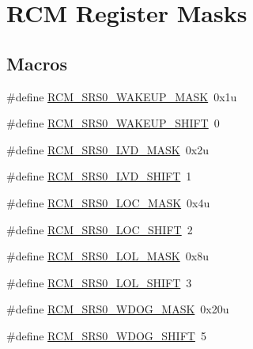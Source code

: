 \hypertarget{group___r_c_m___register___masks}{}\section{R\+CM Register Masks}
\label{group___r_c_m___register___masks}
\subsection*{Macros}
\begin{DoxyCompactItemize}
\item 
\#define \hyperlink{group___r_c_m___register___masks_gacdeb6976064d599d6cd063b26a25dbda}{R\+C\+M\+\_\+\+S\+R\+S0\+\_\+\+W\+A\+K\+E\+U\+P\+\_\+\+M\+A\+SK}~0x1u
\item 
\#define \hyperlink{group___r_c_m___register___masks_ga2e140fc50106a6145cffe4b72671bbc2}{R\+C\+M\+\_\+\+S\+R\+S0\+\_\+\+W\+A\+K\+E\+U\+P\+\_\+\+S\+H\+I\+FT}~0
\item 
\#define \hyperlink{group___r_c_m___register___masks_ga4de74187b3bcc5b40a526b3ab5afda88}{R\+C\+M\+\_\+\+S\+R\+S0\+\_\+\+L\+V\+D\+\_\+\+M\+A\+SK}~0x2u
\item 
\#define \hyperlink{group___r_c_m___register___masks_gad3f4cb02d84182ddd0933dc93e1ec4ba}{R\+C\+M\+\_\+\+S\+R\+S0\+\_\+\+L\+V\+D\+\_\+\+S\+H\+I\+FT}~1
\item 
\#define \hyperlink{group___r_c_m___register___masks_ga0983314adae781518e2481ae518e14d8}{R\+C\+M\+\_\+\+S\+R\+S0\+\_\+\+L\+O\+C\+\_\+\+M\+A\+SK}~0x4u
\item 
\#define \hyperlink{group___r_c_m___register___masks_ga87c1e113b052d6c10c450973efa74eb7}{R\+C\+M\+\_\+\+S\+R\+S0\+\_\+\+L\+O\+C\+\_\+\+S\+H\+I\+FT}~2
\item 
\#define \hyperlink{group___r_c_m___register___masks_ga0db6908ad880d9f7fd190fbb6922adda}{R\+C\+M\+\_\+\+S\+R\+S0\+\_\+\+L\+O\+L\+\_\+\+M\+A\+SK}~0x8u
\item 
\#define \hyperlink{group___r_c_m___register___masks_ga95ccd3811dd00bd56b397939db9b248d}{R\+C\+M\+\_\+\+S\+R\+S0\+\_\+\+L\+O\+L\+\_\+\+S\+H\+I\+FT}~3
\item 
\#define \hyperlink{group___r_c_m___register___masks_gad203634bcb298bf54a3d5cce5c378a7e}{R\+C\+M\+\_\+\+S\+R\+S0\+\_\+\+W\+D\+O\+G\+\_\+\+M\+A\+SK}~0x20u
\item 
\#define \hyperlink{group___r_c_m___register___masks_gac989a90d61cdfb7e612c212a3f6d06d8}{R\+C\+M\+\_\+\+S\+R\+S0\+\_\+\+W\+D\+O\+G\+\_\+\+S\+H\+I\+FT}~5
\item 

\end{DoxyCompactItemize}
